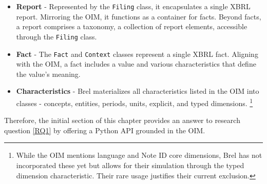 
\begin{itemize}
    \item \textbf{Report} - Represented by the \texttt{Filing} class, it encapsulates a single XBRL report.
    Mirroring the OIM, it functions as a container for facts.
    Beyond facts, a report comprises a taxonomy, a collection of report elements, accessible through the \texttt{Filing} class.
    \item \textbf{Fact} - The \texttt{Fact} and \texttt{Context} classes represent a single XBRL fact.
    Aligning with the OIM, a fact includes a value and various characteristics that define the value's meaning.
    \item \textbf{Characteristics} - Brel materializes all characteristics listed in the OIM into classes - concepts, entities, periods, units, explicit, and typed dimensions.
    \footnote{While the OIM mentions language and Note ID core dimensions, Brel has not incorporated these yet but allows for their simulation through the typed dimension characteristic. Their rare usage justifies their current exclusion.}
\end{itemize}

Therefore, the initial section of this chapter provides an answer to 
research question \ref{RQ1} by offering a Python API grounded in the OIM.

